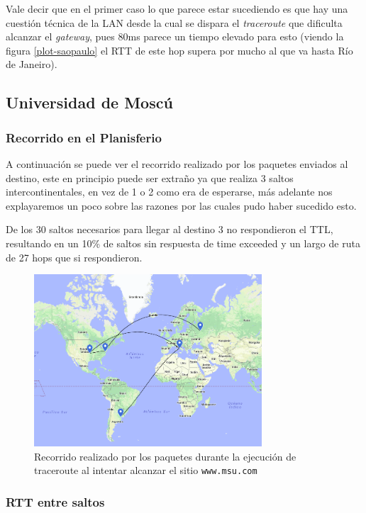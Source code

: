 Vale decir que en el primer caso lo que parece estar sucediendo es que hay una cuestión técnica de la LAN desde la cual se dispara el \emph{traceroute} que dificulta alcanzar el \emph{gateway}, pues 80ms parece un tiempo elevado para esto (viendo la figura \ref{plot-saopaulo} el RTT de este hop supera por mucho al que va hasta Río de Janeiro).

\subsection*{Universidad de Moscú}

\subsubsection*{Recorrido en el Planisferio}

A continuación se puede ver el recorrido realizado por los paquetes enviados al destino, este en principio puede ser extraño ya que realiza 3 saltos intercontinentales, en vez de 1 o 2 como era de esperarse, más adelante nos explayaremos un poco sobre las razones por las cuales pudo haber sucedido esto.

De los 30 saltos necesarios para llegar al destino 3 no respondieron el TTL, resultando en un 10\% de saltos sin respuesta de time exceeded y un largo de ruta de 27 hops que si respondieron.

\begin{figure}[H]
  \centering
  \includegraphics[width=8.5cm]{figs/moscow.png}
  \caption{\footnotesize Recorrido realizado por los paquetes durante la ejecución de traceroute al intentar alcanzar el sitio \texttt{www.msu.com}}
\end{figure}

\subsubsection*{RTT entre saltos}

